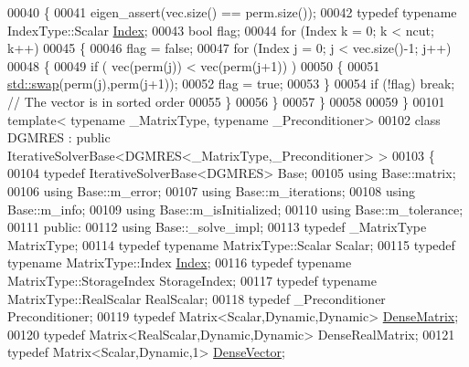 \begin{DoxyCode}
00040 \{
00041   eigen\_assert(vec.size() == perm.size());
00042   \textcolor{keyword}{typedef} \textcolor{keyword}{typename} IndexType::Scalar \hyperlink{namespace_eigen_a62e77e0933482dafde8fe197d9a2cfde}{Index}; 
00043   \textcolor{keywordtype}{bool} flag; 
00044   \textcolor{keywordflow}{for} (Index k  = 0; k < ncut; k++)
00045   \{
00046     flag = \textcolor{keyword}{false};
00047     \textcolor{keywordflow}{for} (Index j = 0; j < vec.size()-1; j++)
00048     \{
00049       \textcolor{keywordflow}{if} ( vec(perm(j)) < vec(perm(j+1)) )
00050       \{
00051         \hyperlink{endian_8c_a3ca5ecd34b04d6a243c054ac3a57f68d}{std::swap}(perm(j),perm(j+1)); 
00052         flag = \textcolor{keyword}{true};
00053       \}
00054       \textcolor{keywordflow}{if} (!flag) \textcolor{keywordflow}{break}; \textcolor{comment}{// The vector is in sorted order}
00055     \}
00056   \}
00057 \}
00058 
00059 \}
00101 \textcolor{keyword}{template}< \textcolor{keyword}{typename} \_MatrixType, \textcolor{keyword}{typename} \_Preconditioner>
00102 \textcolor{keyword}{class }DGMRES : \textcolor{keyword}{public} IterativeSolverBase<DGMRES<\_MatrixType,\_Preconditioner> >
00103 \{
00104     \textcolor{keyword}{typedef} IterativeSolverBase<DGMRES> Base;
00105     \textcolor{keyword}{using} Base::matrix;
00106     \textcolor{keyword}{using} Base::m\_error;
00107     \textcolor{keyword}{using} Base::m\_iterations;
00108     \textcolor{keyword}{using} Base::m\_info;
00109     \textcolor{keyword}{using} Base::m\_isInitialized;
00110     \textcolor{keyword}{using} Base::m\_tolerance; 
00111   \textcolor{keyword}{public}:
00112     \textcolor{keyword}{using} Base::\_solve\_impl;
00113     \textcolor{keyword}{typedef} \_MatrixType MatrixType;
00114     \textcolor{keyword}{typedef} \textcolor{keyword}{typename} MatrixType::Scalar Scalar;
00115     \textcolor{keyword}{typedef} \textcolor{keyword}{typename} MatrixType::Index \hyperlink{namespace_eigen_a62e77e0933482dafde8fe197d9a2cfde}{Index};
00116     \textcolor{keyword}{typedef} \textcolor{keyword}{typename} MatrixType::StorageIndex StorageIndex;
00117     \textcolor{keyword}{typedef} \textcolor{keyword}{typename} MatrixType::RealScalar RealScalar;
00118     \textcolor{keyword}{typedef} \_Preconditioner Preconditioner;
00119     \textcolor{keyword}{typedef} Matrix<Scalar,Dynamic,Dynamic> \hyperlink{group___core___module}{DenseMatrix}; 
00120     \textcolor{keyword}{typedef} Matrix<RealScalar,Dynamic,Dynamic> DenseRealMatrix; 
00121     \textcolor{keyword}{typedef} Matrix<Scalar,Dynamic,1> \hyperlink{group___core___module}{DenseVector};

\end{DoxyCode}

